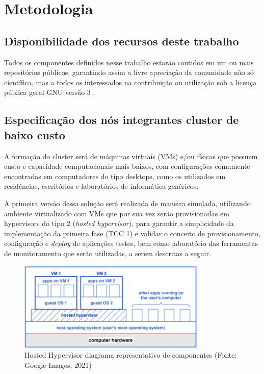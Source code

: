 
\chapter{Metodologia}
\label{chap:metodologia}
\section{Disponibilidade dos recursos deste trabalho}
Todos os componentes definidos nesse trabalho estarão contidos em um ou mais repositórios públicos, garantindo assim a livre apreciação da comunidade não só científica, mas a todos os interessados na contribuição ou utilização sob a licença pública geral GNU versão 3 \cite{foss2022}.

\section{Especificação dos nós integrantes cluster de baixo custo}

A formação do cluster será de máquinas virtuais (VMs) e/ou físicas que possuem custo e capacidade computacionais mais baixos, com configurações comumente encontradas em computadores do tipo desktops, como os utilizados em residências, escritórios e laboratórios de informática genéricos.

A primeira versão dessa solução será realizada de maneira simulada, utilizando ambiente virtualizado com VMs que por sua vez serão provisionadas em hypervisors do tipo 2 \cite{comer_cloud_2021} (\emph{hosted hypervisor}), para garantir a simplicidade da implementação da primeira fase (TCC 1) e validar o conceito de provisionamento, configuração e \emph{deploy} de aplicações testes, bem como laboratório das ferramentas de monitoramento que serão utilizadas, a serem descritas a seguir. 

\begin{figure}[!h]
    \centering
    \includegraphics[width=0.8\textwidth]{04-figuras/vms.png}
    \caption{Hosted Hypervisor diagrama representativo de componentes (Fonte: Google Images, 2021)}
    \label{fig:vms}
\end{figure}

